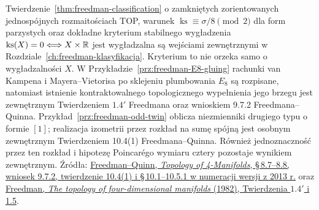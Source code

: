 \begin{description}[leftmargin=2.9cm,style=nextline]
\item[Klasyfikacja Freedmana i niezmiennik Kirby'ego--Siebenmanna.]
  Twierdzenie~\ref{thm:freedman-classification}
  o zamkniętych zorientowanych jednospójnych
  rozmaitościach TOP, warunek
  $\operatorname{ks}\equiv\sigma/8\pmod2$ dla
  form parzystych oraz
  dokładne kryterium stabilnego wygładzenia
  $\operatorname{ks}(X)=0\Longleftrightarrow
  X\times\mathbb{R}$ jest wygładzalna
  są wejściami zewnętrznymi w
  Rozdziale~\ref{ch:freedman-klasyfikacja}.
  Kryterium to nie orzeka samo o wygładzalności $X$.
  W Przykładzie~\ref{prz:freedman-E8-gluing}
  rachunki van Kampena i Mayera--Vietorisa po
  sklejeniu plumbowania $E_8$ są rozpisane,
  natomiast istnienie kontraktowalnego topologicznego
  wypełnienia jego brzegu jest zewnętrznym
  Twierdzeniem $1.4'$ Freedmana oraz wnioskiem 9.7.2
  Freedmana--Quinna. Przykład~\ref{prz:freedman-odd-twin}
  oblicza niezmienniki drugiego typu o formie $[1]$;
  realizacja izometrii przez rozkład na sumę spójną
  jest osobnym zewnętrznym Twierdzeniem 10.4(1)
  Freedmana--Quinna. Również jednoznaczność przez
  ten rozkład i hipotezę Poincarégo wymiaru cztery
  pozostaje wynikiem zewnętrznym.
  Źródła:
  \href{https://archive.mpim-bonn.mpg.de/4789/2/FreedmanQuinn-TopologyOf4Manifolds-Reformatted2013.pdf}
  {Freedman--Quinn, \emph{Topology of 4-Manifolds},
  \S\,8.7--8.8, wniosek 9.7.2, twierdzenie 10.4(1)
  i \S\,10.1--10.5.1 w numeracji wersji z 2013 r.} oraz
  \href{https://www.maths.gla.ac.uk/~mpowell/1982_The%20topology%20of%20four-dimensional%20manifolds.pdf}
  {Freedman, \emph{The topology of four-dimensional
  manifolds} (1982), Twierdzenia $1.4'$ i 1.5}.


\end{description}

